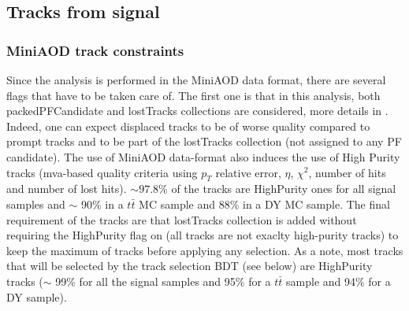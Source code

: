\documentclass{cernatlasnote}
\begin{document}
    \subsection{Tracks from signal}
        \label{SUB:BDTRK}
        \subsubsection{MiniAOD track constraints}
        Since the analysis is performed in the MiniAOD data format, there are several flags that have to be taken care of. The first one is that in this analysis, both packedPFCandidate and lostTracks collections are considered, more details in \cite{MiniAOD}. Indeed, one can expect displaced tracks to be of worse quality compared to prompt tracks and to be part of the lostTracks collection (not assigned to any PF candidate). The use of MiniAOD data-format also induces the use of High Purity tracks  (mva-based quality criteria using $p_T$ relative error, $\eta$, $\chi^2$, number of hits and number of lost hits). $\sim 97.8$\% of the tracks are HighPurity ones for all signal samples and $\sim$ 90\% in a $t\bar{t}$ MC sample and 88\% in a DY MC sample. The final requirement of the tracks are that lostTracks collection is added without requiring the HighPurity flag on (all tracks are not exaclty high-purity tracks) to keep the maximum of tracks before applying any selection. As a note, most tracks that will be selected by the track selection BDT (see below) are HighPurity tracks ($\sim$ 99\% for all the signal samples and 95\% for a $t\bar{t}$ sample and 94\% for a DY sample).

        
\end{document}
